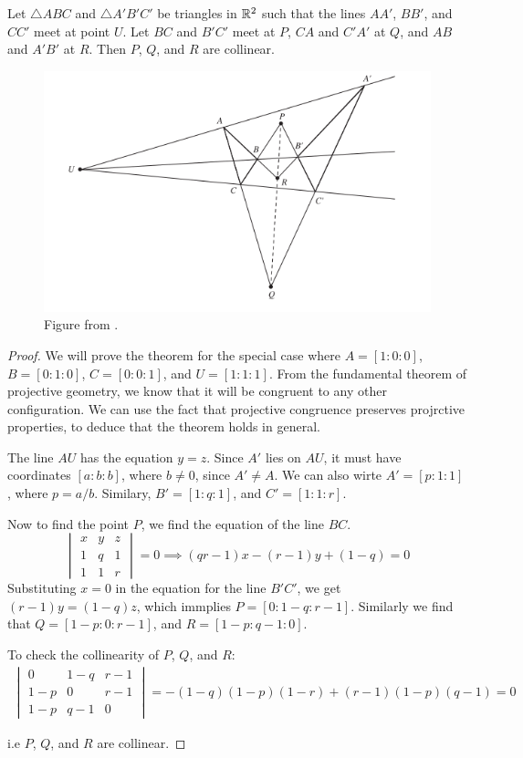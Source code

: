 \begin{theorem}
  Let $\triangle ABC$ and $\triangle A'B'C'$ be triangles in $\mathbb{R}^2$ such that the lines $AA'$,
  $BB'$, and $CC'$ meet at point $U$. Let $BC$ and $B'C'$ meet at $P$, $CA$ and $C'A'$ at $Q$,
  and $AB$ and $A'B'$ at $R$. Then $P$, $Q$, and $R$ are collinear.
\end{theorem}

\begin{figure}[H]
  \center
  \includegraphics[width=0.75\linewidth]{pictures/desargues.png}
  \caption{Figure from \cite{brannan}.}
\end{figure}

\begin{proof}
  We will prove the theorem for the special case where $A=[1:0:0]$, $B=[0:1:0]$, $C=[0:0:1]$,
  and $U=[1:1:1]$. From the fundamental theorem of projective geometry, we know that it will be
  congruent to any other configuration. We can use the fact that projective congruence preserves
  projrctive properties, to deduce that the theorem holds in general.

  The line $AU$ has the equation $y=z$. Since $A'$ lies on $AU$, it must have coordinates
  $[a:b:b]$, where $b\ne 0$, since $A'\ne A$. We can also wirte $A'=[p:1:1]$, where $p=a/b$.
  Similary, $B'=[1:q:1]$, and $C'=[1:1:r]$.

  Now to find the point $P$, we find the equation of the line $BC$.
  \[
    \begin{vmatrix}
      x & y & z\\
      1 & q & 1\\
      1 & 1 & r
    \end{vmatrix}
    =0\implies (qr-1)x-(r-1)y+(1-q)=0
  \]
  Substituting $x=0$ in the equation for the line $B'C'$, we get $(r-1)y=(1-q)z$, which immplies
  $P=[0:1-q:r-1]$. Similarly we find that $Q=[1-p:0:r-1]$, and $R=[1-p:q-1:0]$.

  To check the collinearity of $P$, $Q$, and $R$:
  \begin{align*}
    \begin{vmatrix}
      0   & 1-q & r-1 \\
      1-p & 0   & r-1\\
      1-p & q-1 & 0
    \end{vmatrix}
    = -(1-q)(1-p)(1-r)+(r-1)(1-p)(q-1) = 0
  \end{align*}

  i.e $P$, $Q$, and $R$ are collinear.
\end{proof}

